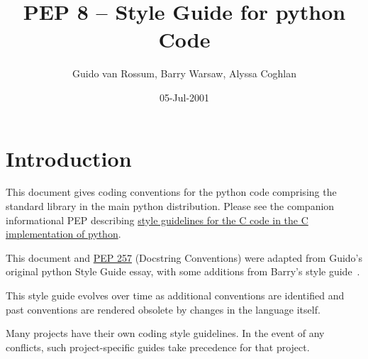 \documentclass[a4paper,11pt]{article}
\title{PEP 8 – Style Guide for python Code}
\author{Guido van Rossum, Barry Warsaw, Alyssa Coghlan}
\date{05-Jul-2001}
\begin{document}
\lstset{language=Python, frame=single, breaklines=true, framerule=0.6pt}
\maketitle
\tableofcontents
\pagebreak
\section{Introduction}
This document gives coding conventions for the python code comprising the 
standard library in the main python distribution. Please see the companion
informational PEP describing
\href{https://peps.python.org/pep-0007/}{style guidelines for the C code in the
C implementation of python}.
\par
This document and
\href{https://peps.python.org/pep-0257/}{PEP 257}
(Docstring Conventions) were adapted from Guido’s
original python Style Guide essay, with some additions from Barry’s style
guide~\cite{Warsaw-Style}.
\par
This style guide evolves over time as additional conventions are identified and
past conventions are rendered obsolete by changes in the language itself.
\par
Many projects have their own coding style guidelines. In the event of any
conflicts, such project-specific guides take precedence for that project.
\par
\end{document}
